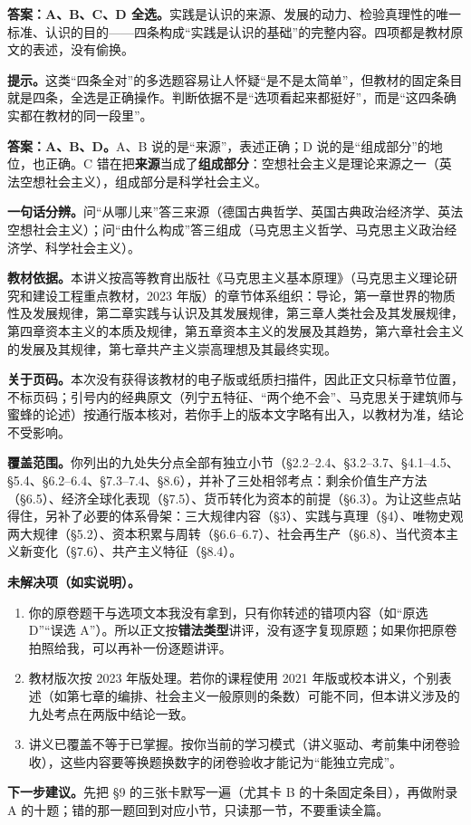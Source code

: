 \documentclass[11pt]{ctexart}
\newcommand{\dw}[1]{\textbf{\color{violetdeep}#1}}   %
\let\orighdr\hdr
\renewcommand{\hdr}[2]{\par\needspace{12\baselineskip}\orighdr{#1}{#2}}
\begin{document}

\textbf{答案：A、B、C、D 全选。}实践是认识的来源、发展的动力、检验真理性的唯一标准、认识的目的——四条构成“实践是认识的基础”的完整内容。四项都是教材原文的表述，没有偷换。

\textbf{提示。}这类“四条全对”的多选题容易让人怀疑“是不是太简单”，但教材的固定条目就是四条，全选是正确操作。判断依据不是“选项看起来都挺好”，而是“这四条确实都在教材的同一段里”。


\textbf{答案：A、B、D。}A、B 说的是“来源”，表述正确；D 说的是“组成部分”的地位，也正确。C 错在把\dw{来源}当成了\dw{组成部分}：空想社会主义是理论来源之一（英法空想社会主义），组成部分是科学社会主义。

\textbf{一句话分辨。}问“从哪儿来”答三来源（德国古典哲学、英国古典政治经济学、英法空想社会主义）；问“由什么构成”答三组成（马克思主义哲学、马克思主义政治经济学、科学社会主义）。

\clearpage
{}

\textbf{教材依据。}本讲义按高等教育出版社《马克思主义基本原理》（马克思主义理论研究和建设工程重点教材，2023 年版）的章节体系组织：导论，第一章世界的物质性及发展规律，第二章实践与认识及其发展规律，第三章人类社会及其发展规律，第四章资本主义的本质及规律，第五章资本主义的发展及其趋势，第六章社会主义的发展及其规律，第七章共产主义崇高理想及其最终实现。

\textbf{关于页码。}本次没有获得该教材的电子版或纸质扫描件，因此正文只标章节位置，不标页码；引号内的经典原文（列宁五特征、“两个绝不会”、马克思关于建筑师与蜜蜂的论述）按通行版本核对，若你手上的版本文字略有出入，以教材为准，结论不受影响。

\textbf{覆盖范围。}你列出的九处失分点全部有独立小节（§2.2--2.4、§3.2--3.7、§4.1--4.5、§5.4、§6.2--6.4、§7.3--7.4、§8.6），并补了三处相邻考点：剩余价值生产方法（§6.5）、经济全球化表现（§7.5）、货币转化为资本的前提（§6.3）。为让这些点站得住，另补了必要的体系骨架：三大规律内容（§3）、实践与真理（§4）、唯物史观两大规律（§5.2）、资本积累与周转（§6.6--6.7）、社会再生产（§6.8）、当代资本主义新变化（§7.6）、共产主义特征（§8.4）。

\textbf{未解决项（如实说明）。}

\begin{enumerate}[label=\arabic*.,leftmargin=2.0em]
\item 你的原卷题干与选项文本我没有拿到，只有你转述的错项内容（如“原选 D”“误选 A”）。所以正文按\dw{错法类型}讲评，没有逐字复现原题；如果你把原卷拍照给我，可以再补一份逐题讲评。
\item 教材版次按 2023 年版处理。若你的课程使用 2021 年版或校本讲义，个别表述（如第七章的编排、社会主义一般原则的条数）可能不同，但本讲义涉及的九处考点在两版中结论一致。
\item 讲义已覆盖不等于已掌握。按你当前的学习模式（讲义驱动、考前集中闭卷验收），这些内容要等换题换数字的闭卷验收才能记为“能独立完成”。
\end{enumerate}

\textbf{下一步建议。}先把 §9 的三张卡默写一遍（尤其卡 B 的十条固定条目），再做附录 A 的十题；错的那一题回到对应小节，只读那一节，不要重读全篇。
\end{document}
